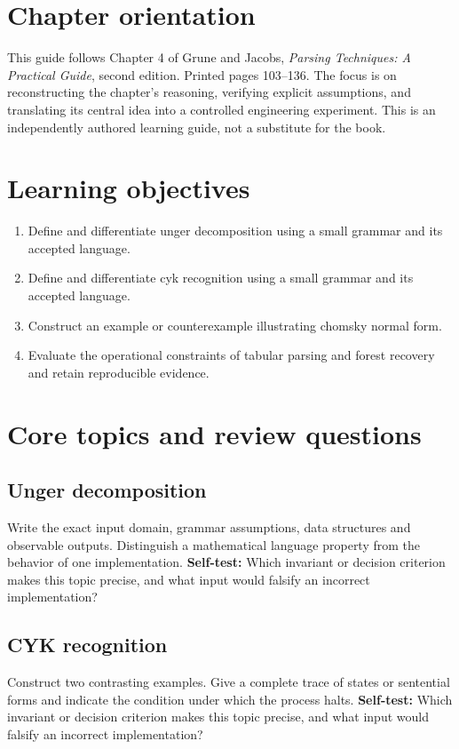 \documentclass[11pt,letterpaper]{article}
\begin{document}
\makedoctitle\makedocsummary
\tableofcontents\clearpage
\section{Chapter orientation}
This guide follows Chapter 4 of Grune and Jacobs, \emph{Parsing Techniques: A Practical Guide}, second edition. Printed pages 103--136. The focus is on reconstructing the chapter's reasoning, verifying explicit assumptions, and translating its central idea into a controlled engineering experiment. This is an independently authored learning guide, not a substitute for the book.
\section{Learning objectives}
\begin{enumerate}
\item Define and differentiate unger decomposition using a small grammar and its accepted language.
\item Define and differentiate cyk recognition using a small grammar and its accepted language.
\item Construct an example or counterexample illustrating chomsky normal form.
\item Evaluate the operational constraints of tabular parsing and forest recovery and retain reproducible evidence.
\end{enumerate}
\section{Core topics and review questions}
\subsection{Unger decomposition}
Write the exact input domain, grammar assumptions, data structures and observable outputs. Distinguish a mathematical language property from the behavior of one implementation.
\textbf{Self-test:} Which invariant or decision criterion makes this topic precise, and what input would falsify an incorrect implementation?
\subsection{CYK recognition}
Construct two contrasting examples. Give a complete trace of states or sentential forms and indicate the condition under which the process halts.
\textbf{Self-test:} Which invariant or decision criterion makes this topic precise, and what input would falsify an incorrect implementation?
\end{document}
